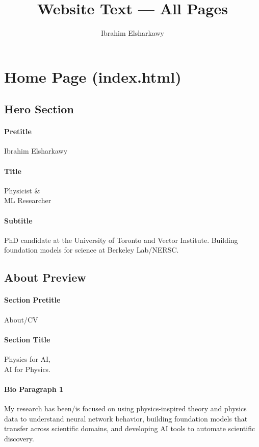 \documentclass[11pt]{article}
\title{Website Text --- All Pages}
\author{Ibrahim Elsharkawy}
\date{}
\begin{document}
\maketitle
\tableofcontents
\newpage

\section{Home Page (index.html)}

\subsection{Hero Section}
\label{sec:home-hero}

\paragraph{Pretitle}
Ibrahim Elsharkawy

\paragraph{Title}
Physicist \&\\
ML Researcher

\paragraph{Subtitle}
PhD candidate at the University of Toronto and Vector Institute. Building foundation models for science at Berkeley Lab/NERSC.

\subsection{About Preview}
\label{sec:home-about}

\paragraph{Section Pretitle}
About/CV

\paragraph{Section Title}
Physics for AI,\\AI for Physics.

\paragraph{Bio Paragraph 1}
 My research has been/is focused on using physics-inspired theory and physics data to understand neural network behavior, building foundation models that transfer across scientific domains, and developing AI tools to automate scientific discovery.
\end{document}

